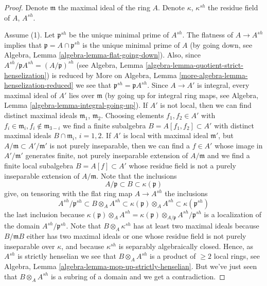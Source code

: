 \begin{proof}
Denote $\mathfrak m$ the maximal ideal of the ring $A$.
Denote $\kappa$, $\kappa^{sh}$ the residue field of $A$, $A^{sh}$.

\medskip\noindent
Assume (1). Let $\mathfrak p^{sh}$ be the unique minimal prime of
$A^{sh}$. The flatness of $A \to A^{sh}$ implies that
$\mathfrak p = A \cap \mathfrak p^{sh}$ is the unique minimal
prime of $A$ (by going down, see
Algebra, Lemma \ref{algebra-lemma-flat-going-down}).
Also, since $A^{sh}/\mathfrak pA^{sh} = (A/\mathfrak p)^{sh}$ (see
Algebra, Lemma \ref{algebra-lemma-quotient-strict-henselization})
is reduced by
More on Algebra, Lemma \ref{more-algebra-lemma-henselization-reduced}
we see that $\mathfrak p^{sh} = \mathfrak pA^{sh}$.
Since $A \to A'$ is integral, every maximal ideal of $A'$ lies over
$\mathfrak m$ (by going up for integral ring maps, see
Algebra, Lemma \ref{algebra-lemma-integral-going-up}).
If $A'$ is not local, then we can find distinct maximal ideals
$\mathfrak m_1$, $\mathfrak m_2$. Choosing elements $f_1, f_2 \in A'$
with $f_i \in \mathfrak m_i, f_i \not \in \mathfrak m_{3 - i}$ we find
a finite subalgebra $B = A[f_1, f_2] \subset A'$ with distinct maximal
ideals $B \cap \mathfrak m_i$, $i = 1, 2$. If $A'$ is local with maximal
ideal $\mathfrak m'$, but $A/\mathfrak m \subset A'/\mathfrak m'$
is not purely inseparable, then we can find a $f \in A'$ whose image in
$A'/\mathfrak m'$ generates finite, not purely inseparable extension
of $A/\mathfrak m$ and we find a finite local subalgebra $B = A[f] \subset A'$
whose residue field is not a purely inseparable extension of $A/\mathfrak m$.
Note that the inclusions
$$
A/\mathfrak p \subset B \subset \kappa(\mathfrak p)
$$
give, on tensoring with the flat ring map $A \to A^{sh}$ the inclusions
$$
A^{sh}/\mathfrak p^{sh} \subset
B \otimes_A A^{sh} \subset
\kappa(\mathfrak p) \otimes_A A^{sh} \subset
\kappa(\mathfrak p^{sh})
$$
the last inclusion because
$\kappa(\mathfrak p) \otimes_A A^{sh} =
\kappa(\mathfrak p) \otimes_{A/\mathfrak p} A^{sh}/\mathfrak p^{sh}$
is a localization of the domain $A^{sh}/\mathfrak p^{sh}$.
Note that $B \otimes_A \kappa^{sh}$ has at least two maximal ideals
because $B/\mathfrak mB$ either has two maximal ideals or one whose
residue field is not purely inseparable over $\kappa$, and because
$\kappa^{sh}$ is separably algebraically closed. Hence, as
$A^{sh}$ is strictly henselian we see that
$B \otimes_A A^{sh}$ is a product of $\geq 2$ local rings, see
Algebra, Lemma \ref{algebra-lemma-mop-up-strictly-henselian}.
But we've just seen that $B \otimes_A A^{sh}$ is a subring of a domain
and we get a contradiction.


\end{proof}
